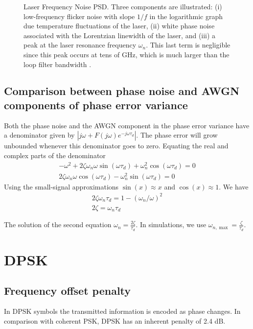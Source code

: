 \documentclass[a4paper]{article}
\begin{document}
\begin{figure} [!t]
	\centering
	
	\caption{Laser Frequency Noise PSD. Three components are illustrated: (i) low-frequency flicker noise with slope $1/f$ in the logarithmic graph due temperature fluctuations of the laser, (ii) white phase noise associated with the Lorentzian linewidth of the laser, and (iii) a peak at the laser resonance frequency $\omega_n$. This last term is negligible since this peak occurs at tens of GHz, which is much larger than the loop filter bandwidth \cite{Kazovsky1986}.} \label{fig:freq_noise_psd}
\end{figure}

\subsection{Comparison between phase noise and AWGN components of phase error variance}

Both the phase noise and the AWGN component in the phase error variance have a denominator given by $|j\omega + F(j\omega)e^{-j\omega\tau_d}|$. The phase error will grow unbounded whenever this denominator goes to zero. Equating the real and complex parts of the denominator
\begin{align}
-\omega^2 + 2\zeta\omega_n\omega\sin(\omega\tau_d) + \omega_n^2\cos(\omega\tau_d) = 0 \\
2\zeta\omega_n\omega\cos(\omega\tau_d) - \omega_n^2\sin(\omega\tau_d) = 0
\end{align}
Using the small-signal approximations $\sin(x)\approx x$ and $\cos(x) \approx 1$. We have
\begin{align}
2\zeta\omega_n\tau_d = 1 - (\omega_n/\omega)^2 \\
2\zeta = \omega_n\tau_d
\end{align}

The solution of the second equation $\omega_n = \frac{2\zeta}{\tau_d}$. In simulations, we use $\omega_{n, \max} = \frac{\zeta}{\tau_d}$.

\section{DPSK}
\subsection{Frequency offset penalty}

In DPSK symbols the transmitted information is encoded as phase changes. In comparison with coherent PSK, DPSK has an inherent penalty of 2.4 dB.
\end{document}

